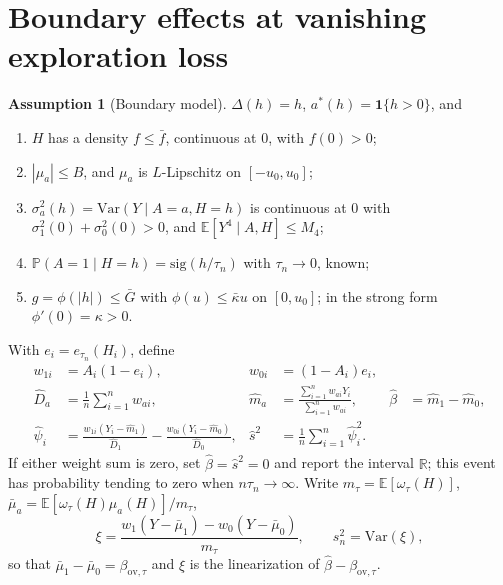\documentclass[12pt]{article}
\theoremstyle{definition}
\newtheorem{assumption}{Assumption}
\theoremstyle{remark}
\newcommand{\E}{\mathbb{E}}
\newcommand{\Prob}{\mathbb{P}}
\newcommand{\Var}{\mathrm{Var}}
\newcommand{\ov}{\mathrm{ov}}
\newcommand{\sgm}{\mathrm{sig}}
\begin{document}
\section{Boundary effects at vanishing exploration loss}\label{sec:boundary}

\begin{assumption}[Boundary model]\label{ass:D}
$\Delta(h)=h$, $a^*(h)=\mathbf 1\{h>0\}$, and
\begin{enumerate}[label=(D\arabic*),leftmargin=3em,itemsep=1pt]
\item $H$ has a density $f\le\bar f$, continuous at $0$, with $f(0)>0$;
\item $|\mu_a|\le B$, and $\mu_a$ is $L$-Lipschitz on $[-u_0,u_0]$;
\item $\sigma_a^2(h)=\Var(Y\mid A=a,H=h)$ is continuous at $0$ with
$\sigma_1^2(0)+\sigma_0^2(0)>0$, and $\E[Y^4\mid A,H]\le M_4$;
\item $\Prob(A=1\mid H=h)=\sgm(h/\tau_n)$ with $\tau_n\to0$, known;
\item $g=\phi(|h|)\le\bar G$ with $\phi(u)\le\bar\kappa u$ on $[0,u_0]$; in the
strong form $\phi'(0)=\kappa>0$.
\end{enumerate}
\end{assumption}

With $e_i=e_{\tau_n}(H_i)$, define
\begin{align}
 w_{1i}&=A_i(1-e_i), & w_{0i}&=(1-A_i)e_i,\nonumber\\
 \hat D_a&=\frac1n\sum_{i=1}^n w_{ai}, &
 \hat m_a&=\frac{\sum_{i=1}^n w_{ai}Y_i}{\sum_{i=1}^n w_{ai}},
 &\hat\beta&=\hat m_1-\hat m_0,\label{eq:boundary-estimator}\\
 \hat\psi_i&=\frac{w_{1i}(Y_i-\hat m_1)}{\hat D_1}
             -\frac{w_{0i}(Y_i-\hat m_0)}{\hat D_0}, &
 \hat s^2&=\frac1n\sum_{i=1}^n\hat\psi_i^2. \label{eq:boundary-se}
\end{align}
If either weight sum is zero, set $\hat\beta=\hat s^2=0$ and report the interval
$\mathbb R$; this event has probability tending to zero when $n\tau_n\to\infty$.
Write $m_\tau=\E[\omega_\tau(H)]$, $\bar\mu_a=\E[\omega_\tau(H)\mu_a(H)]/m_\tau$,
\[
\xi=\frac{w_1(Y-\bar\mu_1)-w_0(Y-\bar\mu_0)}{m_\tau},\qquad s_n^2=\Var(\xi),
\]
so that $\bar\mu_1-\bar\mu_0=\beta_{\ov,\tau}$ and $\xi$ is the linearization of
$\hat\beta-\beta_{\ov,\tau}$.
\end{document}
